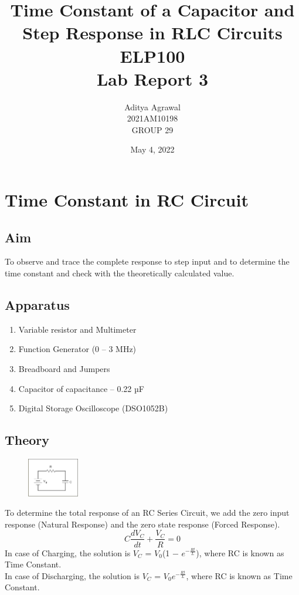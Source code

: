 \documentclass{article}
\title{Time Constant of a Capacitor and Step Response
in RLC Circuits\\ ELP100\\Lab Report 3}
\author{Aditya Agrawal\\2021AM10198\\GROUP 29}
\date{May 4, 2022}
\begin{document}
\maketitle
\tableofcontents
\newpage

\section{ Time Constant in RC Circuit}
\subsection{Aim}
To observe and trace the complete response to step input and to determine the time constant and check with the theoretically calculated value.

\subsection{Apparatus}
\begin{enumerate}
    \item Variable resistor and Multimeter
    \item Function Generator (0 – 3 MHz)
    \item Breadboard and Jumpers
    \item Capacitor of capacitance – 0.22 µF
    \item Digital Storage Oscilloscope (DSO1052B)
\end{enumerate}

\subsection{Theory}
\begin{figure}
\includegraphics[width=0.2\textwidth]{i1.png}
\end{figure}
To determine the total response of an RC Series Circuit, we add the zero input response (Natural Response) and the zero state response (Forced Response).
\begin{equation}
    C \frac{dV_{C}}{dt} + \frac{V_{C}}{R} = 0
\end{equation}
In case of Charging, the solution is $V_{C}$ = $V_{0}$(1 − $e^{- \frac{Rt}{L}}$), where RC is known as Time Constant. \\
In case of Discharging, the solution is $V_{C}$ = $V_{0}$$e^{- \frac{Rt}{L}}$, where RC is known as Time Constant.
\end{document}
